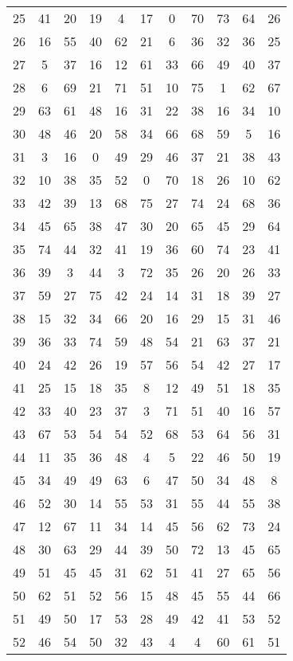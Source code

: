 \begin{table}
\begin{tabular}{c c c c c c c c c c c }
25 & 41 & 20 & 19 & 4 & 17 & 0 & 70 & 73 & 64 & 26 \\
26 & 16 & 55 & 40 & 62 & 21 & 6 & 36 & 32 & 36 & 25 \\
27 & 5 & 37 & 16 & 12 & 61 & 33 & 66 & 49 & 40 & 37 \\
28 & 6 & 69 & 21 & 71 & 51 & 10 & 75 & 1 & 62 & 67 \\
29 & 63 & 61 & 48 & 16 & 31 & 22 & 38 & 16 & 34 & 10 \\
30 & 48 & 46 & 20 & 58 & 34 & 66 & 68 & 59 & 5 & 16 \\
31 & 3 & 16 & 0 & 49 & 29 & 46 & 37 & 21 & 38 & 43 \\
32 & 10 & 38 & 35 & 52 & 0 & 70 & 18 & 26 & 10 & 62 \\
33 & 42 & 39 & 13 & 68 & 75 & 27 & 74 & 24 & 68 & 36 \\
34 & 45 & 65 & 38 & 47 & 30 & 20 & 65 & 45 & 29 & 64 \\
35 & 74 & 44 & 32 & 41 & 19 & 36 & 60 & 74 & 23 & 41 \\
36 & 39 & 3 & 44 & 3 & 72 & 35 & 26 & 20 & 26 & 33 \\
37 & 59 & 27 & 75 & 42 & 24 & 14 & 31 & 18 & 39 & 27 \\
38 & 15 & 32 & 34 & 66 & 20 & 16 & 29 & 15 & 31 & 46 \\
39 & 36 & 33 & 74 & 59 & 48 & 54 & 21 & 63 & 37 & 21 \\
40 & 24 & 42 & 26 & 19 & 57 & 56 & 54 & 42 & 27 & 17 \\
41 & 25 & 15 & 18 & 35 & 8 & 12 & 49 & 51 & 18 & 35 \\
42 & 33 & 40 & 23 & 37 & 3 & 71 & 51 & 40 & 16 & 57 \\
43 & 67 & 53 & 54 & 54 & 52 & 68 & 53 & 64 & 56 & 31 \\
44 & 11 & 35 & 36 & 48 & 4 & 5 & 22 & 46 & 50 & 19 \\
45 & 34 & 49 & 49 & 63 & 6 & 47 & 50 & 34 & 48 & 8 \\
46 & 52 & 30 & 14 & 55 & 53 & 31 & 55 & 44 & 55 & 38 \\
47 & 12 & 67 & 11 & 34 & 14 & 45 & 56 & 62 & 73 & 24 \\
48 & 30 & 63 & 29 & 44 & 39 & 50 & 72 & 13 & 45 & 65 \\
49 & 51 & 45 & 45 & 31 & 62 & 51 & 41 & 27 & 65 & 56 \\
50 & 62 & 51 & 52 & 56 & 15 & 48 & 45 & 55 & 44 & 66 \\
51 & 49 & 50 & 17 & 53 & 28 & 49 & 42 & 41 & 53 & 52 \\
52 & 46 & 54 & 50 & 32 & 43 & 4 & 4 & 60 & 61 & 51 \\

\end{tabular}
\end{table}
